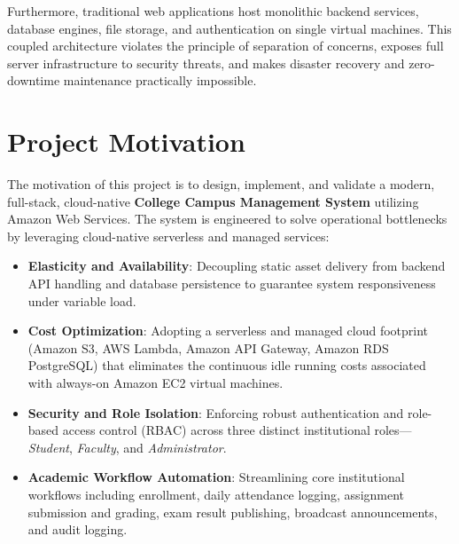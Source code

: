 Furthermore, traditional web applications host monolithic backend services, database engines, file storage, and authentication on single virtual machines. This coupled architecture violates the principle of separation of concerns, exposes full server infrastructure to security threats, and makes disaster recovery and zero-downtime maintenance practically impossible.

\section{Project Motivation}
The motivation of this project is to design, implement, and validate a modern, full-stack, cloud-native \textbf{College Campus Management System} utilizing Amazon Web Services. The system is engineered to solve operational bottlenecks by leveraging cloud-native serverless and managed services:
\begin{itemize}
    \item \textbf{Elasticity and Availability}: Decoupling static asset delivery from backend API handling and database persistence to guarantee system responsiveness under variable load.
    \item \textbf{Cost Optimization}: Adopting a serverless and managed cloud footprint (Amazon S3, AWS Lambda, Amazon API Gateway, Amazon RDS PostgreSQL) that eliminates the continuous idle running costs associated with always-on Amazon EC2 virtual machines.
    \item \textbf{Security and Role Isolation}: Enforcing robust authentication and role-based access control (RBAC) across three distinct institutional roles—\textit{Student}, \textit{Faculty}, and \textit{Administrator}.
    \item \textbf{Academic Workflow Automation}: Streamlining core institutional workflows including enrollment, daily attendance logging, assignment submission and grading, exam result publishing, broadcast announcements, and audit logging.
\end{itemize}

